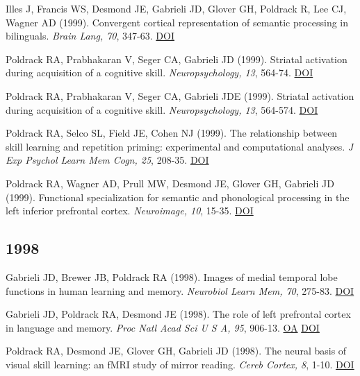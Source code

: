 \documentclass[10pt, letterpaper]{article}
\begin{document}
Illes J, Francis WS, Desmond JE, Gabrieli JD, Glover GH, Poldrack R, Lee CJ, Wagner AD (1999). Convergent cortical representation of semantic processing in bilinguals. \textit{Brain Lang, 70}, 347-63. \href{http://dx.doi.org/10.1006/brln.1999.2186}{DOI} \vspace{2mm}

Poldrack RA, Prabhakaran V, Seger CA, Gabrieli JD (1999). Striatal activation during acquisition of a cognitive skill. \textit{Neuropsychology, 13}, 564-74. \href{http://dx.doi.org/10.1037//0894-4105.13.4.564}{DOI} \vspace{2mm}

Poldrack RA, Prabhakaran V, Seger CA, Gabrieli JDE (1999). Striatal activation during acquisition of a cognitive skill. \textit{Neuropsychology, 13}, 564-574. \href{http://dx.doi.org/10.1037/0894-4105.13.4.564}{DOI} \vspace{2mm}

Poldrack RA, Selco SL, Field JE, Cohen NJ (1999). The relationship between skill learning and repetition priming: experimental and computational analyses. \textit{J Exp Psychol Learn Mem Cogn, 25}, 208-35. \href{http://dx.doi.org/10.1037//0278-7393.25.1.208}{DOI} \vspace{2mm}

Poldrack RA, Wagner AD, Prull MW, Desmond JE, Glover GH, Gabrieli JD (1999). Functional specialization for semantic and phonological processing in the left inferior prefrontal cortex. \textit{Neuroimage, 10}, 15-35. \href{http://dx.doi.org/10.1006/nimg.1999.0441}{DOI} \vspace{2mm}

\subsection*{1998}Gabrieli JD, Brewer JB, Poldrack RA (1998). Images of medial temporal lobe functions in human learning and memory. \textit{Neurobiol Learn Mem, 70}, 275-83. \href{http://dx.doi.org/10.1006/nlme.1998.3853}{DOI} \vspace{2mm}

Gabrieli JD, Poldrack RA, Desmond JE (1998). The role of left prefrontal cortex in language and memory. \textit{Proc Natl Acad Sci U S A, 95}, 906-13. \href{https://www.ncbi.nlm.nih.gov/pmc/articles/PMC33815}{OA} \href{http://dx.doi.org/10.1073/pnas.95.3.906}{DOI} \vspace{2mm}

Poldrack RA, Desmond JE, Glover GH, Gabrieli JD (1998). The neural basis of visual skill learning: an fMRI study of mirror reading. \textit{Cereb Cortex, 8}, 1-10. \href{http://dx.doi.org/10.1093/cercor/8.1.1}{DOI} \vspace{2mm}
\end{document}
